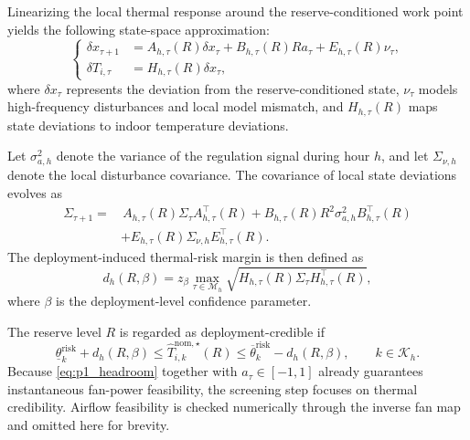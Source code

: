 \documentclass[journal]{IEEEtran}
\theoremstyle{remark}
\begin{document}
	Linearizing the local thermal response around the reserve-conditioned work point yields the following state-space approximation:
	\begin{equation}
		\left\{
		\begin{aligned}
			\delta x_{\tau+1}
			&=
			A_{h,\tau}(R)\delta x_\tau
			+
			B_{h,\tau}(R)R a_\tau
			+
			E_{h,\tau}(R)\nu_\tau ,
			\label{eq:local_state}
			\\
			\delta T_{i,\tau}
			&=
			H_{h,\tau}(R)\delta x_\tau ,
		\end{aligned}
		\right.
	\end{equation}
	where \(\delta x_\tau\) represents the deviation from the reserve-conditioned state, \(\nu_\tau\) models high-frequency disturbances and local model mismatch, and \(H_{h,\tau}(R)\) maps state deviations to indoor temperature deviations.
	
	Let $\sigma_{a,h}^2$ denote the variance of the regulation
	signal during hour $h$, and let $\Sigma_{\nu,h}$ denote the
	local disturbance covariance. The covariance of local state
	deviations evolves as
	\begin{align}
		\Sigma_{\tau+1}
		=&\,
		A_{h,\tau}(R)\Sigma_\tau A_{h,\tau}^{\top}(R)
		+
		B_{h,\tau}(R)R^2\sigma_{a,h}^2 B_{h,\tau}^{\top}(R)
		\nonumber\\
		&+
		E_{h,\tau}(R)\Sigma_{\nu,h}E_{h,\tau}^{\top}(R).
		\label{eq:covariance_prop}
	\end{align}
	The deployment-induced thermal-risk margin is then defined as
	\begin{equation}
		d_h(R,\beta)
		=
		z_{\beta}
		\max_{\tau\in\mathcal{M}_h}
		\sqrt{
			H_{h,\tau}(R)\Sigma_\tau H_{h,\tau}^{\top}(R)
		},
		\label{eq:deployment_margin}
	\end{equation}
	where $\beta$ is the deployment-level confidence parameter.
	
	The reserve level $R$ is regarded as deployment-credible if
	\begin{equation}
		\underline{\theta}_{k}^{\mathrm{risk}}
		+
		d_h(R,\beta)
		\le
		\hat T_{i,k}^{\mathrm{nom},\star}(R)
		\le
		\overline{\theta}_{k}^{\mathrm{risk}}
		-
		d_h(R,\beta),
		\qquad
		k\in\mathcal{K}_h .
		\label{eq:credible_condition}
	\end{equation}
	Because \eqref{eq:p1_headroom} together with
	$a_\tau\in[-1,1]$ already guarantees instantaneous fan-power
	feasibility, the screening step focuses on thermal credibility.
	Airflow feasibility is checked numerically through the inverse
	fan map and omitted here for brevity.
	
\end{document}
